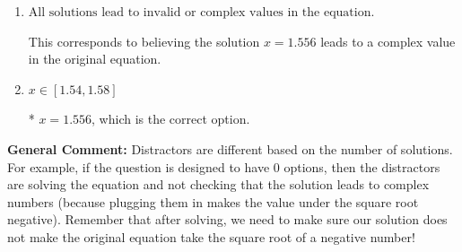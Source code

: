 \documentclass{extbook}[14pt]
\begin{document}
\begin{enumerate}
{\begin{enumerate}[label=\Alph*.]
$x = 0.222$, which corresponds to squaring each square root separately and assigning the negative to the third term.
\item \( \text{All solutions lead to invalid or complex values in the equation.} \)

This corresponds to believing the solution $x = 1.556$ leads to a complex value in the original equation.
\item \( x \in [1.54,1.58] \)

* $x = 1.556$, which is the correct option.
\end{enumerate}

\textbf{General Comment:} Distractors are different based on the number of solutions. For example, if the question is designed to have 0 options, then the distractors are solving the equation and not checking that the solution leads to complex numbers (because plugging them in makes the value under the square root negative). Remember that after solving, we need to make sure our solution does not make the original equation take the square root of a negative number!
}
\end{enumerate}
\end{document}

